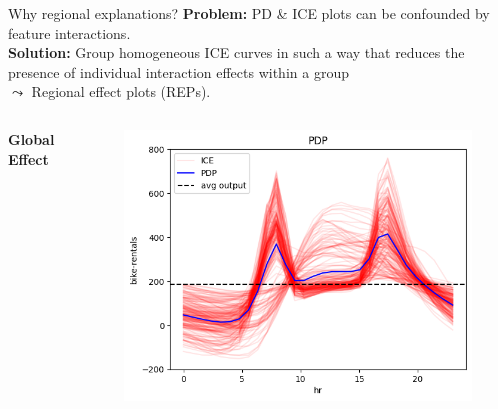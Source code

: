 \documentclass[10pt,compress,t,notes=noshow, xcolor=table]{beamer}
\begin{document}
\begin{frame}{Why regional explanations?}
    \textbf{Problem:} PD \& ICE plots can be confounded by feature interactions.\\
    \textbf{Solution:} Group homogeneous ICE curves in such a way that reduces the presence of individual interaction effects within a group \\$\leadsto$ Regional effect plots (REPs).
  \noindent\makebox[\linewidth]{\rule{\textwidth}{0.4pt}}
  \begin{columns}
      \centering
      \textbf{Global Effect}
      \begin{figure}
          \centering
          \includegraphics[width=.9\linewidth]{figure/01_bike_sharing_dataset_18_1.png}
      \end{figure}


\end{columns}
\end{frame}
\end{document}
